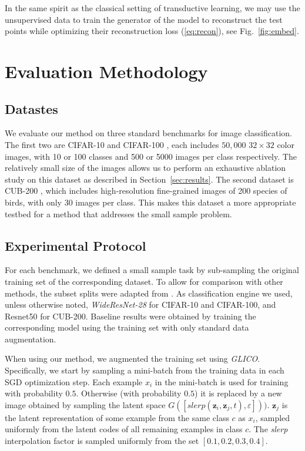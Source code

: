 \documentclass[a4paper,conference]{IEEEtran}
\newcommand{\bz}{{\mathbf z}}
\begin{document}
In the same spirit as the classical setting of transductive learning, we may use the unsupervised data to train the generator of the model to reconstruct the test points while optimizing their reconstruction loss (\ref{eq:recon}), see Fig.~\ref{fig:embed}. 
		
\section{Evaluation Methodology}
\label{sec:evalution}

\subsection{Datastes}

We evaluate our method on three standard benchmarks for image classification. The first two are CIFAR-10 and CIFAR-100 \cite{cifar100}, each includes $50,000$ $32 \times 32$ color images, with 10 or 100 classes and 500 or 5000 images per class respectively. The relatively small size of the images allows us to perform an exhaustive ablation study on this dataset as described in Section~\ref{sec:results}. The second dataset is CUB-200 \cite{WahCUB_200_2011}, which includes high-resolution fine-grained images of 200 species of birds, with only 30 images per class. This makes this dataset a more appropriate testbed for a method that addresses the small sample problem.

		
\subsection{Experimental Protocol}
\label{sec:experiments}

For each benchmark, we defined a small sample task by sub-sampling the original training set of the corresponding dataset. To allow for comparison with other methods, the subset splits were adapted from \cite{cosinesmalldata}. As classification engine we used, unless otherwise noted, \textit{WideResNet-28} \cite{zagoruyko2016wide} for CIFAR-10 and CIFAR-100, and Resnet50 \cite{he2016deep} for CUB-200. Baseline results were obtained by training the corresponding model using the training set with only standard data augmentation. 

When using our method, we augmented the training set using \textit{GLICO}. Specifically, we start by sampling a mini-batch from the training data in each SGD optimization step. Each example $x_i$ in the mini-batch is used for training with probability $0.5$. Otherwise (with probability $0.5$) it is replaced by a new image obtained by sampling the latent space $G([slerp(\bz_i,\bz_j, t),\varepsilon]))$. $\bz_j$ is the latent representation of some example from the same class $c$ as $x_i$, sampled uniformly from the latent codes of all remaining examples in class $c$. The \emph{slerp} interpolation factor is sampled uniformly from the set $[0.1,0.2,0.3,0.4]$.
\end{document}
